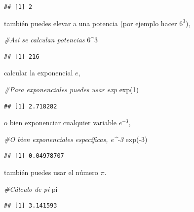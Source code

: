 \documentclass[
]{book}
\newenvironment{Shaded}{\begin{snugshade}}{\end{snugshade}}
\newcommand{\CommentTok}[1]{\textcolor[rgb]{0.56,0.35,0.01}{\textit{#1}}}
\newcommand{\DecValTok}[1]{\textcolor[rgb]{0.00,0.00,0.81}{#1}}
\newcommand{\FunctionTok}[1]{\textcolor[rgb]{0.00,0.00,0.00}{#1}}
\newcommand{\NormalTok}[1]{#1}
\newcommand{\SpecialCharTok}[1]{\textcolor[rgb]{0.00,0.00,0.00}{#1}}
\begin{document}
\begin{verbatim}
## [1] 2
\end{verbatim}

también puedes elevar a una potencia (por ejemplo hacer \(6^3\)),

\begin{Shaded}
\begin{Highlighting}[]
\CommentTok{\#Así se calculan potencias}
\DecValTok{6}\SpecialCharTok{\^{}}\DecValTok{3}
\end{Highlighting}
\end{Shaded}

\begin{verbatim}
## [1] 216
\end{verbatim}

calcular la exponencial \(e\),

\begin{Shaded}
\begin{Highlighting}[]
\CommentTok{\#Para exponenciales puedes usar exp}
\FunctionTok{exp}\NormalTok{(}\DecValTok{1}\NormalTok{)}
\end{Highlighting}
\end{Shaded}

\begin{verbatim}
## [1] 2.718282
\end{verbatim}

o bien exponenciar cualquier variable \(e^{-3}\),

\begin{Shaded}
\begin{Highlighting}[]
\CommentTok{\#O bien exponenciales específicas, e\^{}{-}3}
\FunctionTok{exp}\NormalTok{(}\SpecialCharTok{{-}}\DecValTok{3}\NormalTok{)}
\end{Highlighting}
\end{Shaded}

\begin{verbatim}
## [1] 0.04978707
\end{verbatim}

también puedes usar el número \(\pi\).

\begin{Shaded}
\begin{Highlighting}[]
\CommentTok{\#Cálculo de pi}
\NormalTok{pi}
\end{Highlighting}
\end{Shaded}

\begin{verbatim}
## [1] 3.141593
\end{verbatim}
\end{document}
